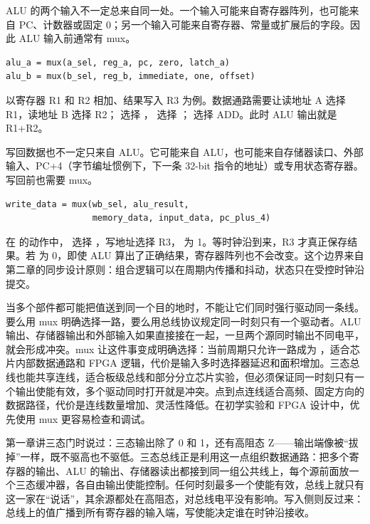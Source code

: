 ALU 的两个输入不一定总来自同一处。一个输入可能来自寄存器阵列，也可能来自 PC、计数器或固定 0；另一个输入可能来自寄存器、常量或扩展后的字段。因此 ALU 输入前通常有 mux。

\begin{lstlisting}
alu_a = mux(a_sel, reg_a, pc, zero, latch_a)
alu_b = mux(b_sel, reg_b, immediate, one, offset)
\end{lstlisting}

以寄存器 R1 和 R2 相加、结果写入 R3 为例。数据通路需要让读地址 A 选择 R1，读地址 B 选择 R2； 选择 ， 选择 ； 选择 ADD。此时 ALU 输出就是 R1+R2。

写回数据也不一定只来自 ALU。它可能来自 ALU，也可能来自存储器读口、外部输入、PC+4（字节编址惯例下，下一条 32-bit 指令的地址）或专用状态寄存器。写回前也需要 mux。

\begin{lstlisting}
write_data = mux(wb_sel, alu_result,
                 memory_data, input_data, pc_plus_4)
\end{lstlisting}

在  的动作中， 选择 ，写地址选择 R3， 为 1。等时钟沿到来，R3 才真正保存结果。若  为 0，即使 ALU 算出了正确结果，寄存器阵列也不会改变。这个边界来自第二章的同步设计原则：组合逻辑可以在周期内传播和抖动，状态只在受控时钟沿提交。

当多个部件都可能把值送到同一个目的地时，不能让它们同时强行驱动同一条线。要么用 mux 明确选择一路，要么用总线协议规定同一时刻只有一个驱动者。ALU 输出、存储器输出和外部输入如果直接接在一起，一旦两个源同时输出不同电平，就会形成冲突。mux 让这件事变成明确选择：当前周期只允许一路成为 ，适合芯片内部数据通路和 FPGA 逻辑，代价是输入多时选择器延迟和面积增加。三态总线也能共享连线，适合板级总线和部分分立芯片实验，但必须保证同一时刻只有一个输出使能有效，多个驱动同时打开就是冲突。点到点连线适合高频、固定方向的数据路径，代价是连线数量增加、灵活性降低。在初学实验和 FPGA 设计中，优先使用 mux 更容易检查和调试。


第一章讲三态门时说过：三态输出除了 0 和 1，还有高阻态 Z——输出端像被“拔掉”一样，既不驱高也不驱低。三态总线正是利用这一点组织数据通路：把多个寄存器的输出、ALU 的输出、存储器读出都接到同一组公共线上，每个源前面放一个三态缓冲器，各自由输出使能控制。任何时刻最多一个使能有效，总线上就只有这一家在“说话”，其余源都处在高阻态，对总线电平没有影响。写入侧则反过来：总线上的值广播到所有寄存器的输入端，写使能决定谁在时钟沿接收。

